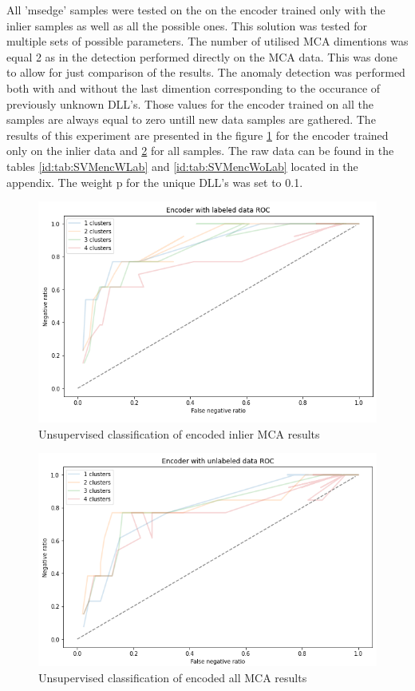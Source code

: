 \documentclass[a4paper,twoside,12pt]{book}
\begin{document}
All 'msedge' samples were tested on the on the encoder trained only with the inlier samples as well
as all the possible ones.
This solution was tested for multiple sets of possible parameters. The number of utilised MCA 
dimentions was equal 2 as in the detection performed directly on the MCA data. This was done to 
allow for just comparison of the results. The anomaly detection was performed
both with and without the last dimention corresponding to the occurance of previously unknown DLL's. Those
values for the encoder trained on all the samples are always equal to zero untill new data samples
are gathered.
The results of this experiment are presented in the figure \ref{fig:EncROCwLab} for 
the encoder trained only on the inlier data and \ref{fig:EncROCwoLab} for all samples. The raw data
can be found in the tables \ref{id:tab:SVMencWLab} and \ref{id:tab:SVMencWoLab} located in the 
appendix. The weight p for the unique DLL's was set to 0.1.

\begin{figure}
	\centering
	\includegraphics[scale=0.9]{images/EncROCwLabKF.PNG}
	\caption{Unsupervised classification of encoded inlier MCA results}
	\label{fig:EncROCwLab}
 \end{figure}

 \begin{figure}
	\centering
	\includegraphics[scale=0.9]{images/EncROCwoLabKF.PNG}
	\caption{Unsupervised classification of encoded all MCA results}
	\label{fig:EncROCwoLab}
 \end{figure}
\end{document}

